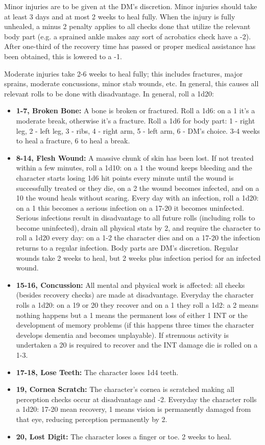 \documentclass[letterpaper,12pt]{article}
\begin{document}
Minor injuries are to be given at the DM's discretion. Minor injuries should take at least 3 days and at most 2 weeks to heal fully. When the injury is fully unhealed, a minus 2 penalty applies to all checks done that utilize the relevant body part (e.g. a sprained ankle makes any sort of acrobatics check have a -2). After one-third of the recovery time has passed or proper medical assistance has been obtained, this is lowered to a -1. 

Moderate injuries take 2-6 weeks to heal fully; this includes fractures, major sprains, moderate concussions, minor stab wounds, etc. In general, this causes all relevant rolls to be done with disadvantage. In general, roll a 1d20:

\begin{itemize}
\item \textbf{1-7, Broken Bone:} A bone is broken or fractured. Roll a 1d6: on a 1 it's a moderate break, otherwise it's a fracture. Roll a 1d6 for body part: 1 - right leg, 2 - left leg, 3 - ribs, 4 - right arm, 5 - left arm, 6 - DM's choice. 3-4 weeks to heal a fracture, 6 to heal a break.
\item \textbf{8-14, Flesh Wound:} A massive chunk of skin has been lost. If not treated within a few minutes, roll a 1d10: on a 1 the wound keeps bleeding and the character starts losing 1d6 hit points every minute until the wound is successfully treated or they die, on a 2 the wound becomes infected, and on a 10 the wound heals without scaring. Every day with an infection, roll a 1d20: on a 1 this becomes a serious infection on a 17-20 it becomes uninfected. Serious infections result in disadvantage to all future rolls (including rolls to become uninfected), drain all physical stats by 2, and require the character to roll a 1d20 every day: on a 1-2 the character dies and on a 17-20 the infection returns to a regular infection. Body parts are DM's discretion. Regular wounds take 2 weeks to heal, but 2 weeks plus infection period for an infected wound. 
\item \textbf{15-16, Concussion:} All mental and physical work is affected: all checks (besides recovery checks) are made at disadvantage. Everyday the character rolls a 1d20: on a 19 or 20 they recover and on a 1 they roll a 1d2: a 2 means nothing happens but a 1 means the permanent loss of either 1 INT or the development of memory problems (if this happens three times the character develops dementia and becomes unplayable). If strenuous activity is undertaken a 20 is required to recover and the INT damage die is rolled on a 1-3. 
\item \textbf{17-18, Lose Teeth:} The character loses 1d4 teeth.
\item \textbf{19, Cornea Scratch:} The character's cornea is scratched making all perception checks occur at disadvantage and -2. Everyday the character rolls a 1d20: 17-20 mean recovery, 1 means vision is permanently damaged from that eye, reducing perception permanently by 2.
\item \textbf{20, Lost Digit:} The character loses a finger or toe. 2 weeks to heal. 
\end{itemize} 
\end{document}
